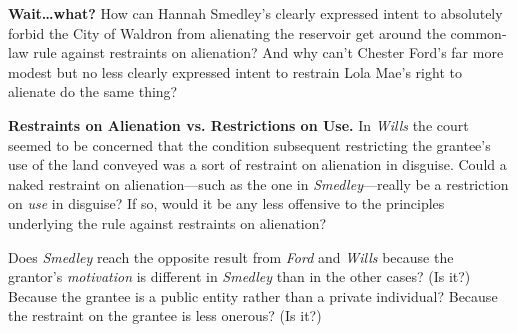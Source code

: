 \item \textbf{Wait{\dots}what?} How can Hannah Smedley's clearly expressed
intent to absolutely forbid the City of Waldron from alienating the reservoir
get around the common-law rule against restraints on alienation? And why can't
Chester Ford's far more modest but no less clearly expressed intent to restrain
Lola Mae's right to alienate do the same thing?


\item \textbf{Restraints on Alienation vs. Restrictions on Use.} In
\textit{Wills} the court seemed to be concerned that the condition subsequent
restricting the grantee's use of the land conveyed was a sort of restraint on
alienation in disguise. Could a naked restraint on alienation---such as the one
in \textit{Smedley}{}---really be a restriction on \textit{use }in disguise? If
so, would it be any less offensive to the principles underlying the rule
against restraints on alienation?


\item Does \textit{Smedley} reach the opposite result from \textit{Ford} and
\textit{Wills} because the grantor's \textit{motivation} is different in
\textit{Smedley} than in the other cases? (Is it?) Because the grantee is a
public entity rather than a private individual? Because the restraint on the
grantee is less onerous? (Is it?)

